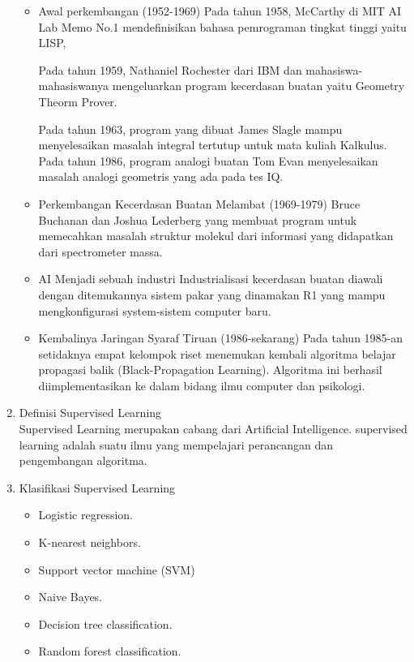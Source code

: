 \begin{enumerate}
\begin{itemize}
\item Awal perkembangan (1952-1969)
Pada tahun 1958, McCarthy di MIT AI Lab Memo No.1 mendefinisikan bahasa pemrograman tingkat tinggi yaitu LISP,

Pada tahun 1959, Nathaniel Rochester dari IBM dan mahasiswa-mahasiswanya mengeluarkan program kecerdasan buatan yaitu Geometry Theorm Prover.

Pada tahun 1963, program yang dibuat James Slagle mampu menyelesaikan masalah integral tertutup untuk mata kuliah Kalkulus.
Pada tahun 1986, program analogi buatan Tom Evan menyelesaikan masalah analogi geometris yang ada pada tes IQ.

\item Perkembangan Kecerdasan Buatan Melambat (1969-1979)
Bruce Buchanan dan Joshua Lederberg yang membuat program untuk memecahkan masalah struktur molekul dari informasi yang didapatkan dari spectrometer massa.

\item AI Menjadi sebuah industri
Industrialisasi kecerdasan buatan diawali dengan ditemukannya sistem pakar yang dinamakan R1 yang mampu mengkonfigurasi system-sistem computer baru. 

\item Kembalinya Jaringan Syaraf Tiruan (1986-sekarang)
Pada tahun 1985-an setidaknya empat kelompok riset menemukan kembali algoritma belajar propagasi balik (Black-Propagation Learning). Algoritma ini berhasil diimplementasikan ke dalam bidang ilmu computer dan psikologi.
\end{itemize}

\item Definisi Supervised Learning\\
Supervised Learning merupakan cabang dari Artificial Intelligence. supervised learning adalah suatu ilmu yang mempelajari perancangan dan pengembangan algoritma.

\item Klasifikasi Supervised Learning
\begin{itemize}
\item Logistic regression.
\item K-nearest neighbors.
\item Support vector machine (SVM)
\item Naive Bayes.
\item Decision tree classification.
\item Random forest classification.
\end{itemize}


\end{enumerate}
